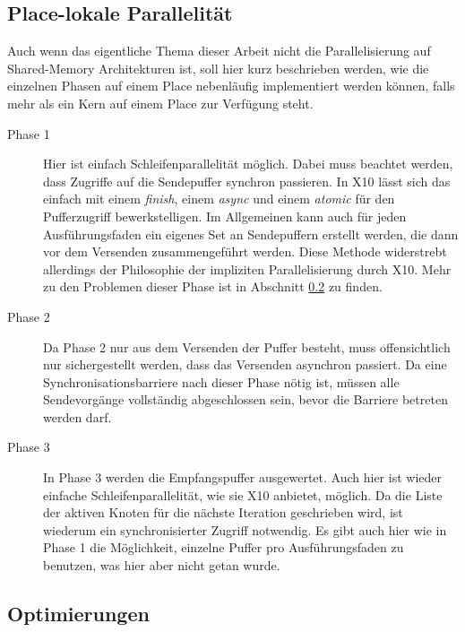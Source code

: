 \subsection{Place-lokale Parallelität} %
\label{sub:place_lokale_parallelit_t}
Auch wenn das eigentliche Thema dieser Arbeit nicht die Parallelisierung auf Shared-Memory Architekturen ist, soll hier kurz beschrieben werden, wie die einzelnen Phasen auf einem Place nebenläufig implementiert werden können, falls mehr als ein Kern auf einem Place zur Verfügung steht.
\begin{description}
	\item[Phase 1] Hier ist einfach Schleifenparallelität möglich. Dabei muss beachtet werden, dass Zugriffe auf die Sendepuffer synchron passieren. In X10 lässt sich das einfach mit einem \textit{finish}, einem \textit{async} und einem \textit{atomic} für den Pufferzugriff bewerkstelligen. Im Allgemeinen kann auch für jeden Ausführungsfaden ein eigenes Set an Sendepuffern erstellt werden, die dann vor dem Versenden zusammengeführt werden. Diese Methode widerstrebt allerdings der Philosophie der impliziten Parallelisierung durch X10. Mehr zu den Problemen dieser Phase ist in Abschnitt \ref{sub:optimierungen} zu finden.	
	\item[Phase 2] Da Phase 2 nur aus dem Versenden der Puffer besteht, muss offensichtlich nur sichergestellt werden, dass das Versenden asynchron passiert. Da eine Synchronisationsbarriere nach dieser Phase nötig ist, müssen alle Sendevorgänge vollständig abgeschlossen sein, bevor die Barriere betreten werden darf.
	\item[Phase 3] In Phase 3 werden die Empfangspuffer ausgewertet. Auch hier ist wieder einfache Schleifenparallelität, wie sie X10 anbietet, möglich. Da die Liste der aktiven Knoten für die nächste Iteration geschrieben wird, ist wiederum ein synchronisierter Zugriff notwendig. Es gibt auch hier wie in Phase 1 die Möglichkeit, einzelne Puffer pro Ausführungsfaden zu benutzen, was hier aber nicht getan wurde.
\end{description}

\subsection{Optimierungen} %
\label{sub:optimierungen}

